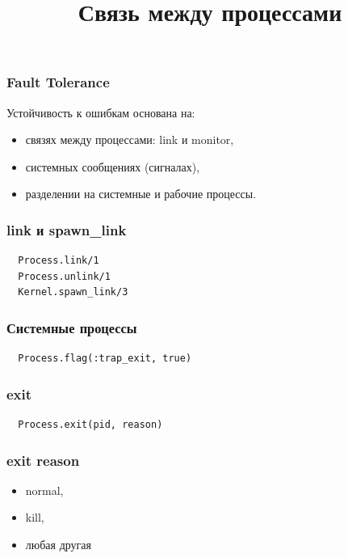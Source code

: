 \documentclass[10pt]{beamer}
\title{Связь между процессами}
\begin{document}
\begin{frame}
  \frametitle{Fault Tolerance}
  Устойчивость к ошибкам основана на:
  \begin{itemize}
    \item связях между процессами: link и monitor,
    \item системных сообщениях (сигналах),
    \item разделении на системные и рабочие процессы.
  \end{itemize}
\end{frame}

\begin{frame}[fragile]
  \frametitle{link и spawn\_link}
  \begin{lstlisting}
  Process.link/1
  Process.unlink/1
  Kernel.spawn_link/3
  \end{lstlisting}
\end{frame}

\begin{frame}[fragile]
  \frametitle{Системные процессы}
  \begin{lstlisting}
  Process.flag(:trap_exit, true)
  \end{lstlisting}
\end{frame}

\begin{frame}[fragile]
  \frametitle{exit}
  \begin{lstlisting}
  Process.exit(pid, reason)
  \end{lstlisting}
\end{frame}

\begin{frame}
  \frametitle{exit reason}
  \begin{itemize}
    \item normal,
    \item kill,
    \item любая другая
  \end{itemize}
\end{frame}
\end{document}
